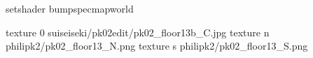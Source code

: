 setshader bumpspecmapworld

texture 0 suiseiseki/pk02edit/pk02_floor13b_C.jpg
texture n philipk2/pk02_floor13_N.png
texture s philipk2/pk02_floor13_S.png

